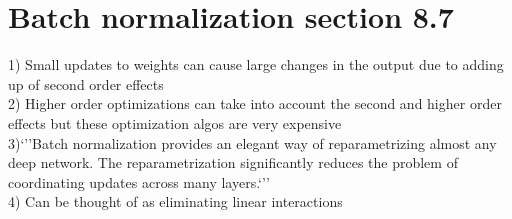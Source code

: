 \documentclass{article}
\begin{document}
%
%
%
\section{Batch normalization section 8.7}
1) Small updates to weights can cause large changes in the output due to adding up of second order effects\\
2) Higher order optimizations can take into account the second and higher order effects but these optimization algos are very expensive\\
3)`''Batch normalization provides an elegant way of reparametrizing almost any deep
network. The reparametrization significantly reduces the problem of coordinating
updates across many layers.`''\\
4) Can be thought of as eliminating linear interactions
%
%
%
\end{document}
